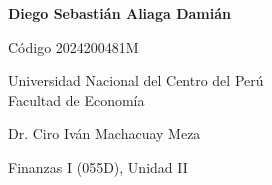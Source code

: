{\begin{frame}[plain,t]
\begin{minipage}[t]{0.71\textwidth}
    \vspace{0.35cm}
    \begin{minipage}[t]{0.52\linewidth}
      \par{\small\bfseries Diego Sebastián Aliaga Damián}\par{\scriptsize Código 2024200481M}\par\vspace{0.2cm}
      \par{\scriptsize Universidad Nacional del Centro del Perú\\Facultad de Economía}
    \end{minipage}\hfill
    \begin{minipage}[t]{0.44\linewidth}
      \par{\scriptsize Dr. Ciro Iván Machacuay Meza}\par\vspace{0.2cm}
      \par{\scriptsize Finanzas I (055D), Unidad II}
    \end{minipage}
  \end{minipage}
\end{frame}
}

